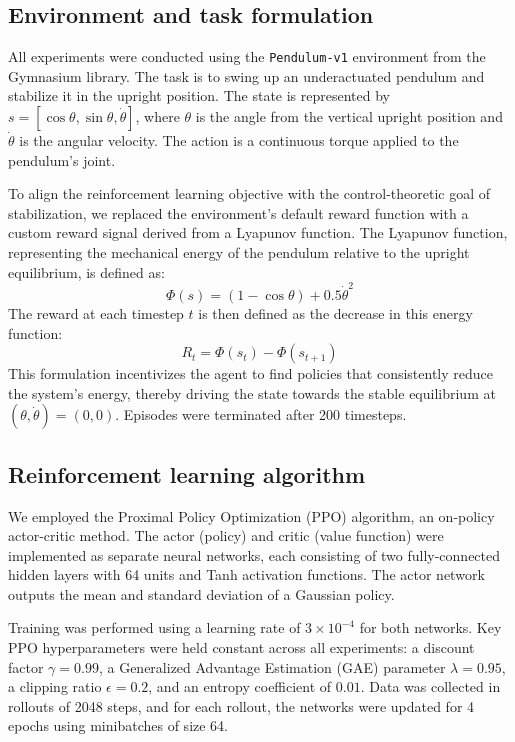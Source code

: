 \documentclass[]{article}
\begin{document}
\subsection{Environment and task formulation}
All experiments were conducted using the \texttt{Pendulum-v1} environment from the Gymnasium library. The task is to swing up an underactuated pendulum and stabilize it in the upright position. The state is represented by $s = [\cos\theta, \sin\theta, \dot\theta]$, where $\theta$ is the angle from the vertical upright position and $\dot\theta$ is the angular velocity. The action is a continuous torque applied to the pendulum's joint.

To align the reinforcement learning objective with the control-theoretic goal of stabilization, we replaced the environment's default reward function with a custom reward signal derived from a Lyapunov function. The Lyapunov function, representing the mechanical energy of the pendulum relative to the upright equilibrium, is defined as:
\begin{equation}
\Phi(s) = (1 - \cos\theta) + 0.5\dot\theta^2
\end{equation}
The reward at each timestep $t$ is then defined as the decrease in this energy function:
\begin{equation}
R_t = \Phi(s_t) - \Phi(s_{t+1})
\end{equation}
This formulation incentivizes the agent to find policies that consistently reduce the system's energy, thereby driving the state towards the stable equilibrium at $(\theta, \dot\theta) = (0, 0)$. Episodes were terminated after 200 timesteps.

\subsection{Reinforcement learning algorithm}
We employed the Proximal Policy Optimization (PPO) algorithm, an on-policy actor-critic method. The actor (policy) and critic (value function) were implemented as separate neural networks, each consisting of two fully-connected hidden layers with 64 units and Tanh activation functions. The actor network outputs the mean and standard deviation of a Gaussian policy.

Training was performed using a learning rate of $3 \times 10^{-4}$ for both networks. Key PPO hyperparameters were held constant across all experiments: a discount factor $\gamma = 0.99$, a Generalized Advantage Estimation (GAE) parameter $\lambda = 0.95$, a clipping ratio $\epsilon = 0.2$, and an entropy coefficient of $0.01$. Data was collected in rollouts of 2048 steps, and for each rollout, the networks were updated for 4 epochs using minibatches of size 64.
\end{document}
